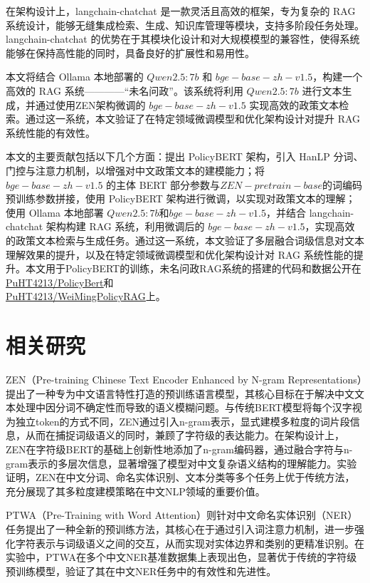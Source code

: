 \documentclass[12pt, a4paper]{ctexart}
\begin{document}
在架构设计上，langchain-chatchat 是一款灵活且高效的框架，专为复杂的 RAG 系统设计，能够无缝集成检索、生成、知识库管理等模块，支持多阶段任务处理\cite{langchainchatchat}。langchain-chatchat 的优势在于其模块化设计和对大规模模型的兼容性，使得系统能够在保持高性能的同时，具备良好的扩展性和易用性。

本文将结合 Ollama 本地部署的 $Qwen2.5:7b$ 和 $ bge-base-zh-v1.5 $，构建一个高效的 RAG 系统————“未名问政”。该系统将利用 $Qwen2.5:7b$ 进行文本生成，并通过使用ZEN架构微调的 $ bge-base-zh-v1.5 $ 实现高效的政策文本检索。通过这一系统，本文验证了在特定领域微调模型和优化架构设计对提升 RAG 系统性能的有效性。

本文的主要贡献包括以下几个方面：提出 PolicyBERT 架构，引入 HanLP 分词、门控与注意力机制，以增强对中文政策文本的建模能力；将 $ bge-base-zh-v1.5 $ 的主体 BERT 部分参数与$ZEN-pretrain-base$的词编码预训练参数拼接，使用 PolicyBERT 架构进行微调，以实现对政策文本的理解；使用 Ollama 本地部署 $Qwen2.5:7b$和$ bge-base-zh-v1.5 $，并结合 langchain-chatchat 架构构建 RAG 系统，利用微调后的 $ bge-base-zh-v1.5 $，实现高效的政策文本检索与生成任务。通过这一系统，本文验证了多层融合词级信息对文本理解效果的提升，以及在特定领域微调模型和优化架构设计对 RAG 系统性能的提升。本文用于PolicyBERT的训练，未名问政RAG系统的搭建的代码和数据公开在\href{https://github.com/PuHT4213/PolicyBert}{\underline{PuHT4213/PolicyBert}}和\\\href{https://github.com/PuHT4213/WeiMingPolicyRAG}{\underline{PuHT4213/WeiMingPolicyRAG}}上。




\section{相关研究}
ZEN（Pre-training Chinese Text Encoder Enhanced by N-gram Representations）提出了一种专为中文语言特性打造的预训练语言模型，其核心目标在于解决中文文本处理中因分词不确定性而导致的语义模糊问题\cite{diao-etal-2020-zen}。与传统BERT模型将每个汉字视为独立token的方式不同，ZEN通过引入n-gram表示，显式建模多粒度的词片段信息，从而在捕捉词级语义的同时，兼顾了字符级的表达能力。在架构设计上，ZEN在字符级BERT的基础上创新性地添加了n-gram编码器，通过融合字符与n-gram表示的多层次信息，显著增强了模型对中文复杂语义结构的理解能力。实验证明，ZEN在中文分词、命名实体识别、文本分类等多个任务上优于传统方法，充分展现了其多粒度建模策略在中文NLP领域的重要价值。

PTWA（Pre-Training with Word Attention）则针对中文命名实体识别（NER）任务提出了一种全新的预训练方法，其核心在于通过引入词注意力机制，进一步强化字符表示与词级语义之间的交互，从而实现对实体边界和类别的更精准识别\cite{Ma2021PTWAPW}。在实验中，PTWA在多个中文NER基准数据集上表现出色，显著优于传统的字符级预训练模型，验证了其在中文NER任务中的有效性和先进性。
\end{document}
